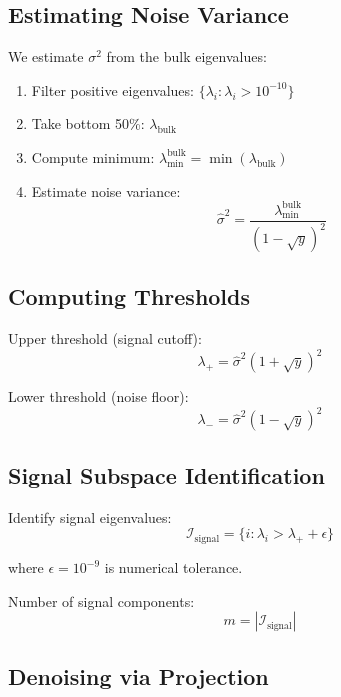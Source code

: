 \documentclass[12pt,a4paper]{article}
\begin{document}
\subsection{Estimating Noise Variance}

We estimate $\sigma^2$ from the bulk eigenvalues:

\begin{enumerate}
    \item Filter positive eigenvalues: $\{\lambda_i : \lambda_i > 10^{-10}\}$
    \item Take bottom 50\%: $\lambda_{\text{bulk}}$
    \item Compute minimum: $\lambda_{\min}^{\text{bulk}} = \min(\lambda_{\text{bulk}})$
    \item Estimate noise variance:
    \begin{equation}
    \hat{\sigma}^2 = \frac{\lambda_{\min}^{\text{bulk}}}{(1-\sqrt{y})^2}
    \end{equation}
\end{enumerate}

\subsection{Computing Thresholds}

Upper threshold (signal cutoff):
\begin{equation}
\lambda_+ = \hat{\sigma}^2(1 + \sqrt{y})^2
\end{equation}

Lower threshold (noise floor):
\begin{equation}
\lambda_- = \hat{\sigma}^2(1 - \sqrt{y})^2
\end{equation}

\subsection{Signal Subspace Identification}

Identify signal eigenvalues:
\begin{equation}
\mathcal{I}_{\text{signal}} = \{i : \lambda_i > \lambda_+ + \epsilon\}
\end{equation}

where $\epsilon = 10^{-9}$ is numerical tolerance.

Number of signal components:
\begin{equation}
m = |\mathcal{I}_{\text{signal}}|
\end{equation}

\subsection{Denoising via Projection}
\end{document}
